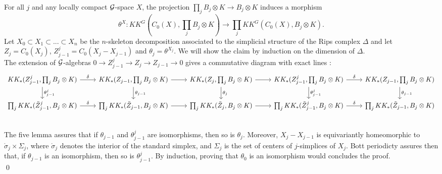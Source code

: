 \begin{dem}
For all $j$ and any locally compact $\mathcal G$-space $X$, the projection $\prod_j B_j\otimes K\rightarrow B_j \otimes K$ induces a morphism
\[\theta^X : KK^G(C_0(X),\prod_j B_j\otimes K )\rightarrow \prod_j  KK^G(C_0(X),B_j\otimes K ).\]
Let $X_0\subset X_1 \subset ...\subset X_n$ be the $n$-skeleton decomposition associated to the simplicial structure of the Rips complex $\Delta$ and let $Z_j = C_0(X_j)$, $Z^j_{j-1} = C_0(X_j-X_{j-1})$ and $\theta_j = \theta^{X_j}$.
We will show the claim by induction on the dimension of $\Delta$.\\

The extension of $\mathcal G$-algebras $0\rightarrow Z^j_{j-1} \rightarrow Z_j \rightarrow Z_{j-1}\rightarrow 0$ gives a commutative diagram with exact lines :
\[\begin{tikzcd}
KK_*(Z^j_{j-1},\prod_j B_j\otimes K)\arrow{r}{\delta}\arrow{d}{\theta^j_{j-1}} & KK_*(Z_{j-1},\prod_j B_j\otimes K)\arrow{r}\arrow{d}{\theta_{j-1}} & KK_*(Z_j,\prod_j B_j\otimes K)\arrow{r}\arrow{d}{\theta_j} & KK_*(Z^j_{j-1},\prod_j B_j\otimes K)\arrow{r}{\delta} \arrow{d}{\theta^j_{j-1}} & KK_*(Z_{j-1},\prod_j B_j\otimes K)\arrow{d}{\theta_{j-1}}\\
\prod_j KK_*(\tilde Z^j_{j-1},B_j \otimes K)\arrow{r}{\delta} & \prod_j KK_*(\tilde Z_{j-1},B_j \otimes K)\arrow{r} & \prod_j KK_*(\tilde Z_j,B_j \otimes K)\arrow{r} & \prod_j KK_*(\tilde Z^j_{j-1},B_j \otimes K)\arrow{r}{\delta} & \prod_j KK_*(\tilde Z_{j-1},B_j \otimes K)\\
\end{tikzcd}\]
The five lemma assures that if $\theta_{j-1}$ and $\theta^j_{j-1}$ are isomorphisms, then so is $\theta_j$. Moreover, $X_j-X_{j-1}$ is equivariantly homeomorphic to $\mathring \sigma_j \times \Sigma_j$, where  $\mathring \sigma _ j $ denotes the interior of the standard simplex, and   $\Sigma_j$ is the set of centers of $j$-simplices of $X_j$. Bott periodicty assures then that, if $\theta_{j-1}$ is an isomorphism, then so is $\theta^j_{j-1}$. By induction, proving that $\theta_0$ is an isomorphism would concludes the proof.\\
\qed
\end{dem}








































